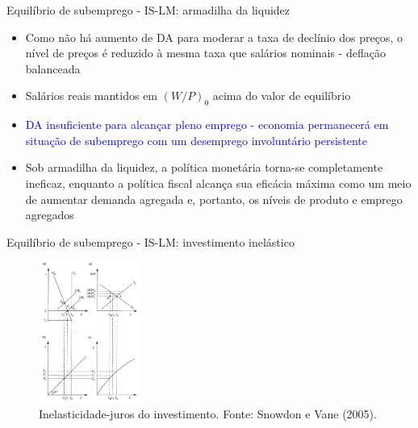 \documentclass[10pt]{beamer}
\begin{document}
\begin{frame}{Equilíbrio de subemprego - IS-LM: armadilha da liquidez}
    \begin{itemize}
        \item Como não há aumento de DA para moderar a taxa de declínio dos preços, o nível de preços é reduzido à mesma taxa que salários nominais - deflação balanceada
        \bigskip
        \item Salários reais mantidos em $(W/P)_0$ acima do valor de equilíbrio
        \bigskip
        \item \textcolor{blue}{DA insuficiente para alcançar pleno emprego - economia permanecerá em situação de subemprego com um desemprego involuntário persistente}
        \bigskip
        \item Sob armadilha da liquidez, a política monetária torna-se completamente ineficaz, enquanto a política fiscal alcança sua eficácia máxima como um meio de aumentar demanda agregada e, portanto, os níveis de produto e emprego agregados
    \end{itemize}
\end{frame}

\begin{frame}{Equilíbrio de subemprego - IS-LM: investimento inelástico}
    \begin{figure}
        \centering
        \includegraphics[width=0.3\textwidth]{./figures/aula7_fig3.PNG}
        \caption{Inelasticidade-juros do investimento. Fonte: Snowdon e Vane (2005).}
        \label{fig3}
    \end{figure}
\end{frame}
\end{document}
